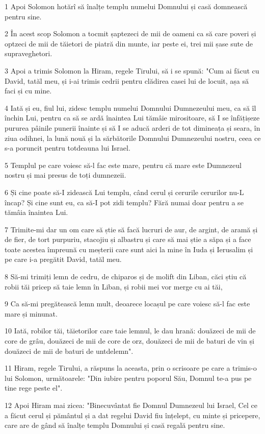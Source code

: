 \par 1 Apoi Solomon hotărî să înalțe templu numelui Domnului și casă domnească pentru sine.
\par 2 În acest scop Solomon a tocmit șaptezeci de mii de oameni ca să care poveri și optzeci de mii de tăietori de piatră din munte, iar peste ei, trei mii șase sute de supraveghetori.
\par 3 Apoi a trimis Solomon la Hiram, regele Tirului, să i se spună: "Cum ai făcut cu David, tatăl meu, și i-ai trimis cedrii pentru clădirea casei lui de locuit, așa să faci și cu mine.
\par 4 Iată și eu, fiul lui, zidesc templu numelui Domnului Dumnezeului meu, ca să îl închin Lui, pentru ca să se ardă înaintea Lui tămâie mirositoare, să I se înfățișeze pururea pâinile punerii înainte și să I se aducă arderi de tot dimineața și seara, în ziua odihnei, la lună nouă și la sărbătorile Domnului Dumnezeului nostru, ceea ce s-a poruncit pentru totdeauna lui Israel.
\par 5 Templul pe care voiesc să-l fac este mare, pentru că mare este Dumnezeul nostru și mai presus de toți dumnezeii.
\par 6 Și cine poate să-I zidească Lui templu, când cerul și cerurile cerurilor nu-L încap? Și cine sunt eu, ca să-I pot zidi templu? Fără numai doar pentru a se tămâia înaintea Lui.
\par 7 Trimite-mi dar un om care să știe să facă lucruri de aur, de argint, de aramă și de fier, de tort purpuriu, stacojiu și albastru și care să mai știe a săpa și a face toate acestea împreună cu meșterii care sunt aici la mine în Iuda și Ierusalim și pe care i-a pregătit David, tatăl meu.
\par 8 Să-mi trimiți lemn de cedru, de chiparos și de molift din Liban, căci știu că robii tăi pricep să taie lemn în Liban, și robii mei vor merge cu ai tăi,
\par 9 Ca să-mi pregătească lemn mult, deoarece locașul pe care voiesc să-l fac este mare și minunat.
\par 10 Iată, robilor tăi, tăietorilor care taie lemnul, le dau hrană: douăzeci de mii de core de grâu, douăzeci de mii de core de orz, douăzeci de mii de baturi de vin și douăzeci de mii de baturi de untdelemn".
\par 11 Hiram, regele Tirului, a răspuns la aceasta, prin o scrisoare pe care a trimis-o lui Solomon, următoarele: "Din iubire pentru poporul Său, Domnul te-a pus pe tine rege peste el".
\par 12 Apoi Hiram mai zicea: "Binecuvântat fie Domnul Dumnezeul lui Israel, Cel ce a făcut cerul și pământul și a dat regelui David fiu înțelept, cu minte și pricepere, care are de gând să înalțe templu Domnului și casă regală pentru sine.
